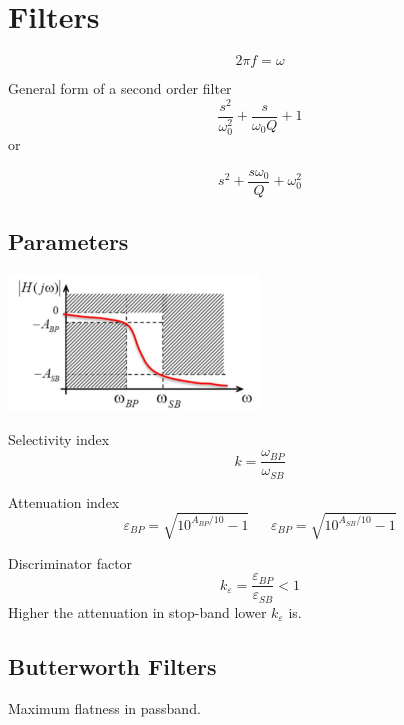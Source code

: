 \chapter{Filters}

\begin{equation}
2\pi f=\omega
\end{equation}

General form of a second order filter 
\begin{equation}
\frac{s^2}{\omega_0^2}+\frac{s}{\omega_0 Q}+1
\end{equation}
\centering
or

\raggedright
\begin{equation}
s^2+\frac{s \omega_0}{Q}+\omega_0^2
\end{equation}
\section{Parameters}

\centering
\includegraphics[width=0.5\textwidth]{mask.png}\\
\raggedright

Selectivity index
\begin{equation}
k=\frac{\omega_{BP}}{\omega_{SB}}
\end{equation}

Attenuation index
\begin{equation}
\varepsilon_{BP}=\sqrt{10^{A_{BP}/10}-1} \ \ \ \ \ \ \ \varepsilon_{BP}=\sqrt{10^{A_{SB}/10}-1}
\end{equation}

Discriminator factor 
\begin{equation}
k_{\varepsilon}=\frac{\varepsilon_{BP}}{\varepsilon_{SB}}<1
\end{equation}
Higher the attenuation in stop-band lower $k_{\varepsilon}$ is.

\section{Butterworth Filters}
Maximum flatness in passband.\\


